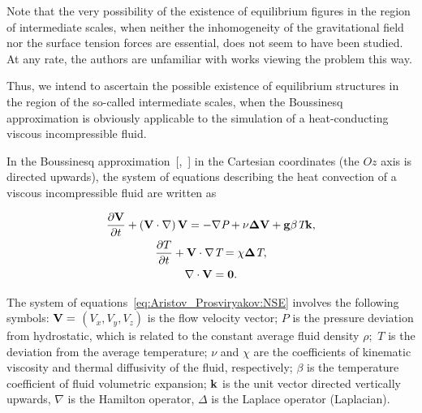 Note that the very possibility of the existence of equilibrium figures in the region of intermediate scales, when neither the inhomogeneity of the gravitational field nor the surface tension forces are essential, does not seem to have been studied. At any rate, the authors are unfamiliar with works viewing the problem this way.



Thus, we intend to ascertain the possible existence of equilibrium structures in the region of the so-called intermediate scales, when the Boussinesq approximation is obviously applicable to the simulation of a heat-conducting viscous incompres\-sible fluid.





\smallskip












In the Boussinesq approximation~[,~] in the Cartesian coordinates (the $Oz$  axis is directed upwards), the system of equations describing the heat convection of a viscous incompressible fluid are written as

\begin{gather}

\frac{\partial \bf{V}}{\partial t}+\left(\bf{V}\cdot\nabla\right)\bf{V}=-\nabla \textit{P} + \nu \Delta \bf{V}+g \beta \textit{T} \bold{k},

\\    

      \label{eq:Aristov_Prosviryakov:NSE}

\frac{\partial T}{\partial t}+\bf{V}\cdot\nabla \textit{T}=\chi \Delta \textit{T},

\\     

\nabla \cdot \bf{V}=0.

 \end{gather}

The system of equations~\eqref{eq:Aristov_Prosviryakov:NSE} involves the following symbols: $\bf{V}=$ $\left(V_x , V_y , V_z\right)$  is the flow velocity vector;  $P$  is the pressure deviation from hydrostatic, which is related to the constant average fluid density  $\rho;$  $T$ is the deviation from the average temperature;   $\nu$  and $\chi$ are the coefficients of kinematic viscosity and thermal diffusivity of the fluid, respectively; $\beta$ is the temperature coefficient of fluid volumetric expansion; $\bold{k}$  is the unit vector directed vertically upwards, $\nabla$  is the Hamilton operator,  $\Delta$ is the Laplace operator (Laplacian).




